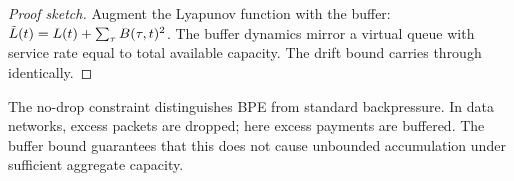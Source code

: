 \begin{proof}[Proof sketch]
Augment the Lyapunov function with the buffer: $\tilde{L}(t) = L(t) + \sum_\tau B(\tau, t)^2$.
The buffer dynamics mirror a virtual queue with service rate equal to total
available capacity. The drift bound carries through identically.
\end{proof}

\begin{remark}
The no-drop constraint distinguishes BPE from standard backpressure. In data
networks, excess packets are dropped; here excess payments are buffered. The
buffer bound guarantees that this does not cause unbounded accumulation under
sufficient aggregate capacity.
\end{remark}
